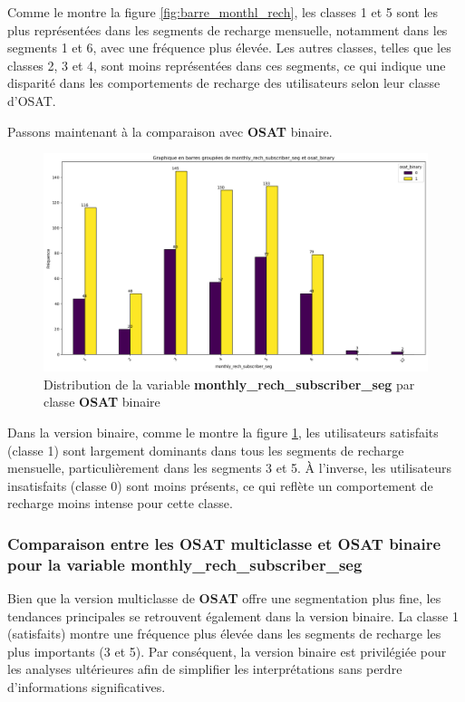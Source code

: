 Comme le montre la figure \ref{fig:barre_monthl_rech}, les classes 1 et 5 sont les plus représentées dans les segments de recharge mensuelle, notamment dans les segments 1 et 6, avec une fréquence plus élevée. Les autres classes, telles que les classes 2, 3 et 4, sont moins représentées dans ces segments, ce qui indique une disparité dans les comportements de recharge des utilisateurs selon leur classe d'OSAT.

Passons maintenant à la comparaison avec \textbf{OSAT} binaire.

\begin{figure}[H]
    \centering
    \includegraphics[width=1\linewidth]{barre_monthl_rech_binary.png}
    \caption{Distribution de la variable \textbf{monthly\_rech\_subscriber\_seg} par classe \textbf{OSAT} binaire}
    \label{fig:barre_monthl_rech_binary}
\end{figure}

Dans la version binaire, comme le montre la figure \ref{fig:barre_monthl_rech_binary}, les utilisateurs satisfaits (classe 1) sont largement dominants dans tous les segments de recharge mensuelle, particulièrement dans les segments 3 et 5. À l'inverse, les utilisateurs insatisfaits (classe 0) sont moins présents, ce qui reflète un comportement de recharge moins intense pour cette classe.

\subsubsection*{Comparaison entre les OSAT multiclasse et OSAT binaire pour la variable \textbf{monthly\_rech\_subscriber\_seg}} 
Bien que la version multiclasse de \textbf{OSAT} offre une segmentation plus fine, les tendances principales se retrouvent également dans la version binaire. La classe 1 (satisfaits) montre une fréquence plus élevée dans les segments de recharge les plus importants (3 et 5). Par conséquent, la version binaire est privilégiée pour les analyses ultérieures afin de simplifier les interprétations sans perdre d'informations significatives.

